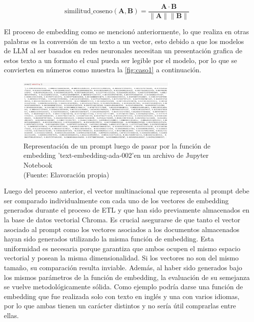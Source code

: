 \begin{equation}
    \text{similitud\_coseno}(\mathbf{A}, \mathbf{B}) = \frac{\mathbf{A} \cdot \mathbf{B}}{\|\mathbf{A}\| \|\mathbf{B}\|}
    \label{eq:similitudcoseno}
\end{equation}


\newpage

El proceso de embedding como se mencionó anteriormente, lo que realiza en otras palabras es la conversión de un texto a un vector, esto debido a que los modelos de LLM al ser basados 
en redes neuronales necesitan un presentación grafica de estos texto a un formato el cual pueda ser legible por el modelo, por lo que se convierten en números como muestra la 
\autoref{fig:caso1} a continuación. 

\begin{figure}[ht!]
    \centering
    \includegraphics[width=0.7\textwidth]{figures/embedding1.png}
    \caption[Representación vectorial de un prompt luego de pasar por la función de embedding]{Representación de un prompt luego de pasar por la función de embedding 'text-embedding-ada-002'en un archivo de Jupyter Notebook\\
    {\scriptsize (Fuente: Elavoración propia)}}
    \label{fig:caso1}
\end{figure}


Luego del proceso anterior, el vector multinacional que representa al prompt debe ser comparado individualmente con cada uno de los 
vectores de embedding generados durante el proceso de ETL y que han sido previamente almacenados en la base de datos vectorial Chroma. 
Es crucial asegurarse de que tanto el vector asociado al prompt como los vectores asociados a los documentos almacenados hayan 
sido generados utilizando la misma función de embedding. Esta uniformidad es necesaria porque garantiza que ambos ocupen el mismo 
espacio vectorial y posean la misma dimensionalidad. Si los vectores no son del mismo tamaño, su comparación resulta inviable. 
Además, al haber sido generados bajo los mismos parámetros de la función de embedding, la evaluación de su semejanza se vuelve 
metodológicamente sólida. Como ejemplo podría darse una función de embedding que fue realizada solo con texto en inglés y una con 
varios idiomas, por lo que ambas tienen un carácter distintos y no sería útil comprarlas entre ellas.

